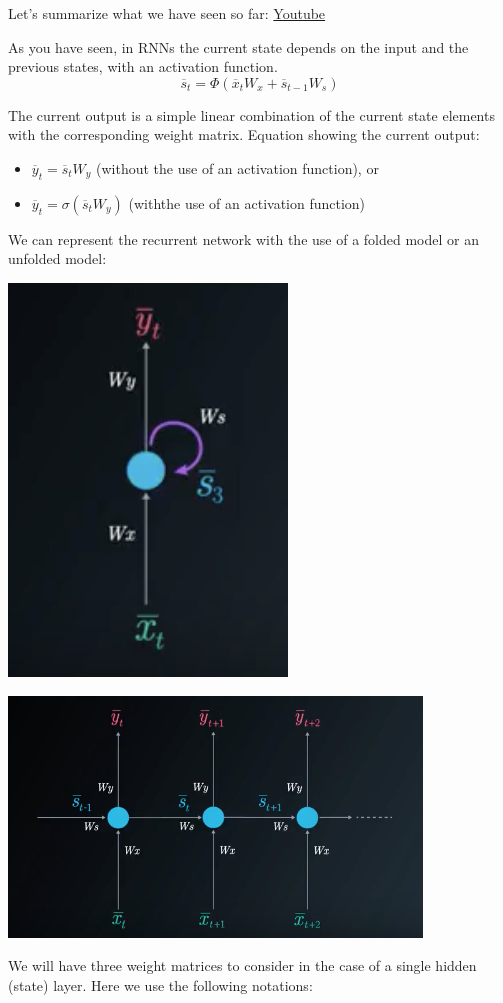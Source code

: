 Let's summarize what we have seen so far: \href{https://www.youtube.com/watch?v=nXP0oGGRrO8&ab_channel=Udacity}{Youtube} \newline

As you have seen, in RNNs the current state depends on the input and the previous states, with an activation function. \[\overline{s}_t = \Phi (\overline{x}_t W_x + \overline{s}_{t-1} W_s)\] 

The current output is a simple linear combination of the current state elements with the corresponding weight matrix. Equation showing the current output:
\begin{itemize}
    \item \(\overline{y}_t = \overline{s}_t W_y\) (without the use of an activation function), or
    \item \(\overline{y}_t = \sigma(\overline{s}_t W_y)\) (withthe use of an activation function)
\end{itemize}
We can represent the recurrent network with the use of a folded model or an unfolded model:

\includegraphics[width=0.25\linewidth]{img//rnn//intro/screen-shot-2017-11-27-at-2.44.11-pm.png}

\includegraphics[width=0.5\linewidth]{img//rnn//intro/screen-shot-2017-11-27-at-3.48.31-pm.png}

We will have three weight matrices to consider in the case of a single hidden (state) layer. Here we use the following notations:\newline


